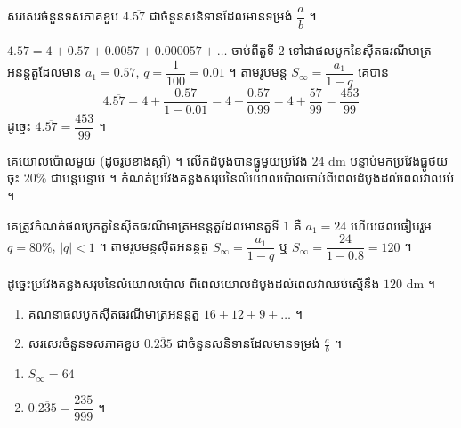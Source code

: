 \begin{example}[លំហាត់គំរូ ២]
សរសេរចំនួនទសភាគខួប $4.\overline{57}$ ជាចំនួនសនិទានដែលមានទម្រង់ $\dfrac{a}{b}$ ។
\end{example}
\ans
$4.\overline{57} = 4 + 0.57 + 0.0057 + 0.000057 + \ldots$ ចាប់ពីតួទី $2$ ទៅជាផលបូកនៃស៊ីតធរណីមាត្រអនន្តតួដែលមាន $a_1 = 0.57$, $q = \dfrac{1}{100} = 0.01$ ។ តាមរូបមន្ត $S_\infty = \dfrac{a_1}{1 - q}$ គេបាន
\[ 4.\overline{57} = 4 + \frac{0.57}{1 - 0.01} = 4 + \frac{0.57}{0.99} = 4 + \frac{57}{99} = \frac{453}{99} \]
ដូច្នេះ $4.\overline{57} = \dfrac{453}{99}$ ។

\begin{example}[លំហាត់គំរូ ៣]
គេយោលប៉ោលមួយ (ដូចរូបខាងស្តាំ) ។ លើកដំបូងបានធ្នូមួយប្រវែង $24\text{ dm}$ បន្ទាប់មកប្រវែងធ្នូថយចុះ $20\%$ ជាបន្តបន្ទាប់ ។ កំណត់ប្រវែងគន្លងសរុបនៃលំយោលប៉ោលចាប់ពីពេលដំបូងដល់ពេលវាឈប់ ។

\begin{center}
\end{center}
\end{example}
\ans
គេត្រូវកំណត់ផលបូកតួនៃស៊ីតធរណីមាត្រអនន្តតួដែលមានតួទី $1$ គឺ $a_1 = 24$ ហើយផលធៀបរួម $q = 80\%$, $|q| < 1$ ។ តាមរូបមន្តស៊ីតអនន្តតួ $S_\infty = \dfrac{a_1}{1 - q}$ ឬ $S_\infty = \dfrac{24}{1 - 0.8} = 120$ ។

ដូច្នេះប្រវែងគន្លងសរុបនៃលំយោលប៉ោល ពីពេលយោលដំបូងដល់ពេលវាឈប់ស្មើនឹង $120\text{ dm}$ ។

\begin{pro}
\begin{enumerate}[a]
  \item គណនាផលបូកស៊ីតធរណីមាត្រអនន្តតួ $16 + 12 + 9 + \ldots$ ។
  \item សរសេរចំនួនទសភាគខួប $0.\overline{235}$ ជាចំនួនសនិទានដែលមានទម្រង់ $\frac{a}{b}$ ។
\end{enumerate}
\ans
\begin{enumerate}[a]
  \item $S_\infty = 64$
  \item $0.\overline{235} = \dfrac{235}{999}$ ។
\end{enumerate}
\end{pro}

